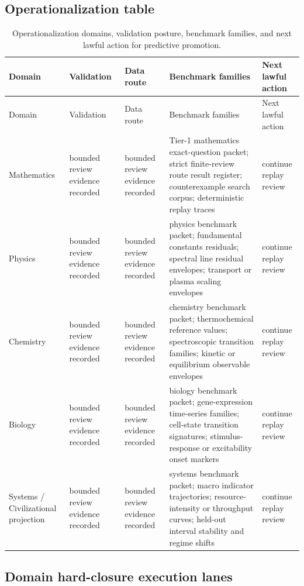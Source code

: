 \subsection{Operationalization table}
\begin{octablescope}
\begin{longtable}{@{}L{0.13\textwidth}L{0.14\textwidth}L{0.17\textwidth}L{0.31\textwidth}L{0.15\textwidth}@{}}
\caption{Operationalization domains, validation posture, benchmark families, and next lawful action for predictive promotion.}\label{tab:r013-operationalization-program}\\
\toprule
Domain & Validation & Data route & Benchmark families & Next lawful action \\
\midrule
\endfirsthead
\toprule
Domain & Validation & Data route & Benchmark families & Next lawful action \\
\midrule
\endhead
Mathematics & bounded review evidence recorded & bounded review evidence recorded & Tier-1 mathematics exact-question packet; strict finite-review route result register; counterexample search corpus; deterministic replay traces & continue replay review \\
Physics & bounded review evidence recorded & bounded review evidence recorded & physics benchmark packet; fundamental constants residuals; spectral line residual envelopes; transport or plasma scaling envelopes & continue replay review \\
Chemistry & bounded review evidence recorded & bounded review evidence recorded & chemistry benchmark packet; thermochemical reference values; spectroscopic transition families; kinetic or equilibrium observable envelopes & continue replay review \\
Biology & bounded review evidence recorded & bounded review evidence recorded & biology benchmark packet; gene-expression time-series families; cell-state transition signatures; stimulus-response or excitability onset markers & continue replay review \\
Systems / Civilizational projection & bounded review evidence recorded & bounded review evidence recorded & systems benchmark packet; macro indicator trajectories; resource-intensity or throughput curves; held-out interval stability and regime shifts & continue replay review \\
\bottomrule
\end{longtable}
\end{octablescope}

\subsection{Domain hard-closure execution lanes}
